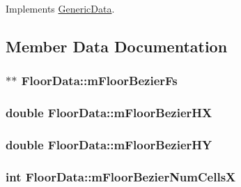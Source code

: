 Implements \hyperlink{class_generic_data_a93ea61de5b09cf3fc95564ef3d841214}{Generic\-Data}.



\subsection{Member Data Documentation}
\hypertarget{class_floor_data_aef2684a379485861a0b2f81fe62df2df}{
\subsubsection[{m\-Floor\-Bezier\-Fs}]{$\ast$$\ast$ Floor\-Data\-::m\-Floor\-Bezier\-Fs}}\label{class_floor_data_aef2684a379485861a0b2f81fe62df2df}
\hypertarget{class_floor_data_a38eed166299a5c25dd4358964afa0a2a}{
\subsubsection[{m\-Floor\-Bezier\-H\-X}]{\setlength{\rightskip}{0pt plus 5cm}double Floor\-Data\-::m\-Floor\-Bezier\-H\-X}}\label{class_floor_data_a38eed166299a5c25dd4358964afa0a2a}
\hypertarget{class_floor_data_a264969dc13604a1a021e4b7084c2c00a}{
\subsubsection[{m\-Floor\-Bezier\-H\-Y}]{\setlength{\rightskip}{0pt plus 5cm}double Floor\-Data\-::m\-Floor\-Bezier\-H\-Y}}\label{class_floor_data_a264969dc13604a1a021e4b7084c2c00a}
\hypertarget{class_floor_data_a01fcc4a53643be6819fc3a8488436135}{
\subsubsection[{m\-Floor\-Bezier\-Num\-Cells\-X}]{\setlength{\rightskip}{0pt plus 5cm}int Floor\-Data\-::m\-Floor\-Bezier\-Num\-Cells\-X}}\label{class_floor_data_a01fcc4a53643be6819fc3a8488436135}
